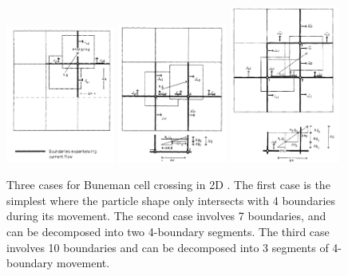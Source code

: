 \begin{figure}[h]
  \centering
  \includegraphics[width=0.32\textwidth]{pics/chap1/buneman-1.png}
  \includegraphics[width=0.32\textwidth]{pics/chap1/buneman-2.png}
  \includegraphics[width=0.32\textwidth]{pics/chap1/buneman-3.png}
  \caption[Three cases for Buneman cell crossing in 2D.]{Three cases for Buneman
    cell crossing in 2D \citep{villasenor_rigorous_1992}. The first case is the
    simplest where the particle shape only intersects with 4 boundaries during
    its movement. The second case involves 7 boundaries, and can be decomposed
    into two 4-boundary segments. The third case involves 10 boundaries and can
    be decomposed into 3 segments of 4-boundary movement.}
  \label{fig:buneman}
\end{figure}

